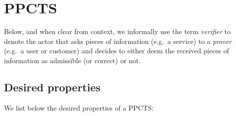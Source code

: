 \documentclass[runningheads,10pt]{llncs}
\numberwithin{equation}{section}
\begin{document}
\section{PPCTS}
\label{sec:capts}

Below, and when clear from context, we informally use the term \emph{verifier}
to denote the actor that asks pieces of information (e.g.~a service) to a
\emph{prover} (e.g.~a user or customer) and decides to either deem the received
pieces of information as admissible (or correct) or not.

\subsection{Desired properties}
\label{sec:desired_properties}
We list below the desired properties of a PPCTS:
\end{document}
